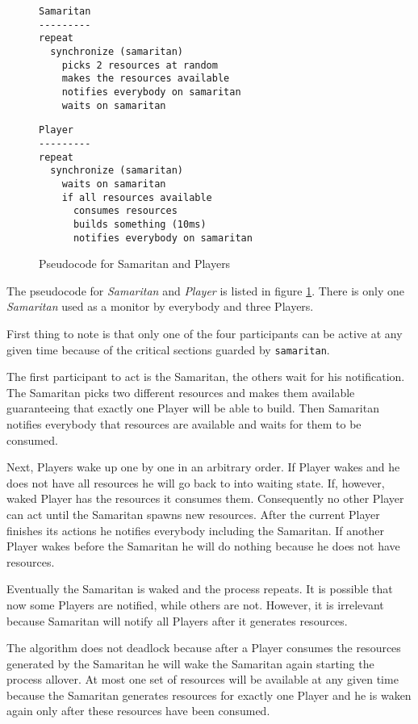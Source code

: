 \documentclass[12pt]{article}
\begin{document}
\begin{figure}[h!]
  \small
  \begin{minipage}{0.5\linewidth}
    \begin{Verbatim}[frame=single]
Samaritan
---------
repeat
  synchronize (samaritan)
    picks 2 resources at random
    makes the resources available
    notifies everybody on samaritan
    waits on samaritan

    \end{Verbatim}
  \end{minipage}
  \begin{minipage}{0.5\linewidth}
    \begin{Verbatim}[frame=single]
Player
---------
repeat
  synchronize (samaritan)
    waits on samaritan
    if all resources available
      consumes resources
      builds something (10ms)
      notifies everybody on samaritan
    \end{Verbatim}
  \end{minipage}
  \caption{Pseudocode for Samaritan and Players}
  \label{fig:samaritan-pseudocode}
\end{figure}

The pseudocode for \emph{Samaritan} and \emph{Player} is listed in figure
\ref{fig:samaritan-pseudocode}. There is only one \emph{Samaritan} used
as a monitor by everybody and three Players.

First thing to note is that only one of the four participants can be
active at any given time because of the critical sections
guarded by \texttt{samaritan}.

The first participant to act is the Samaritan,
the others wait for his notification. The Samaritan picks two different 
resources and makes them available guaranteeing that exactly one Player
will be able to build. Then Samaritan notifies everybody that
resources are available and waits for them to be consumed.

Next, Players wake up one by one in an arbitrary order. If Player wakes and
he does not have all resources he will go back to into waiting state.  If,
however, waked Player has the resources it consumes them. Consequently no other
Player can act until the Samaritan spawns new resources. After the current
Player finishes its actions he notifies everybody including the Samaritan.
If another Player wakes before the Samaritan he will do nothing because
he does not have resources.

Eventually the Samaritan is waked and the process repeats. It
is possible that now some Players are notified, while others are
not. However, it is irrelevant because Samaritan will notify
all Players after it generates resources.

The algorithm does not deadlock because after a Player consumes the resources
generated by the Samaritan he will wake the Samaritan again starting the
process allover.  At most one set of resources will be available at any
given time because the Samaritan generates resources for exactly one Player
and he is waken again only after these resources have been consumed.
\end{document}
